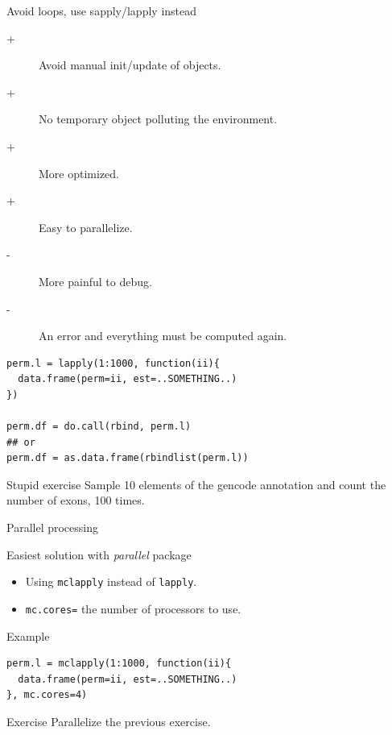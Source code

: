 \documentclass[10pt]{beamer}
\begin{document}
\begin{frame}[fragile]{Avoid loops, use {\sf sapply/lapply} instead}
  \begin{block}{}
    \begin{description}
    \item[+] Avoid manual init/update of objects.
    \item[+] No temporary object polluting the environment.
    \item[+] More optimized.
    \item[+] Easy to parallelize.
    \item[-] More painful to debug.
    \item[-] An error and everything must be computed again.
    \end{description}
  \end{block}
  \begin{block}{}
  \begin{lstlisting}
perm.l = lapply(1:1000, function(ii){
  data.frame(perm=ii, est=..SOMETHING..)
})

perm.df = do.call(rbind, perm.l)
## or
perm.df = as.data.frame(rbindlist(perm.l))
  \end{lstlisting}
  \end{block}
  \begin{alertblock}{Stupid exercise}
    Sample 10 elements of the gencode annotation and count the number of exons, 100 times.
  \end{alertblock}
\end{frame}

\begin{frame}[fragile]{Parallel processing}
  \begin{block}{Easiest solution with {\it parallel} package}
    \begin{itemize}
    \item Using \verb!mclapply! instead of \verb!lapply!.
    \item \verb!mc.cores=! the number of processors to use.
    \end{itemize}
  \end{block}
  \begin{exampleblock}{Example}
\begin{lstlisting}
perm.l = mclapply(1:1000, function(ii){
  data.frame(perm=ii, est=..SOMETHING..)
}, mc.cores=4)
\end{lstlisting}
  \end{exampleblock}
  \begin{alertblock}{Exercise}
    Parallelize the previous exercise.
  \end{alertblock}
\end{frame}
\end{document}
